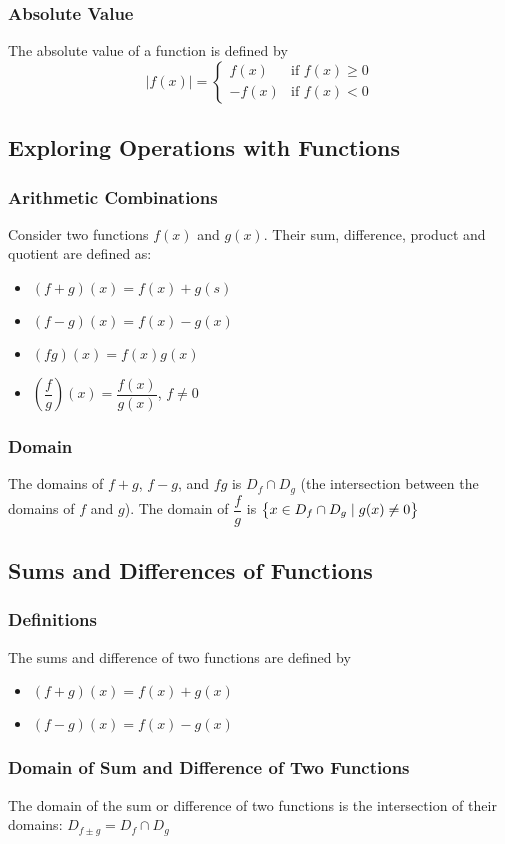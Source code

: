 \documentclass{article}
\begin{document}
	\subsubsection{Absolute Value}
	The absolute value of a function is defined by
	\[|f(x)|=\begin{cases}
		f(x)&\text{if }f(x)\geq0\\
		-f(x)&\text{if }f(x)<0
	\end{cases}\]
	\subsection{Exploring Operations with Functions}
	\subsubsection{Arithmetic Combinations}
	Consider two functions $f(x)$ and $g(x)$. Their sum, difference, product and quotient are defined as:
	\begin{itemize}
		\item $(f+g)(x)=f(x)+g(s)$
		\item $(f-g)(x)=f(x)-g(x)$
		\item $(fg)(x)=f(x)g(x)$
		\item $\left(\dfrac{f}{g}\right)(x)=\dfrac{f(x)}{g(x)}$, $f\neq0$
	\end{itemize}
	\subsubsection{Domain}
	The domains of $f+g$, $f-g$, and $fg$ is $D_f\cap D_g$ (the intersection between the domains of $f$ and $g$). The domain of $\dfrac{f}{g}$ is $\set{x\in D_f\cap D_g\mid g(x)\neq0}$
	\setcounter{section}{9}
	\setcounter{subsection}{1}
	\subsection{Sums and Differences of Functions}
	\subsubsection{Definitions}
	The sums and difference of two functions are defined by
	\begin{itemize}
		\item $(f+g)(x)=f(x)+g(x)$
		\item $(f-g)(x)=f(x)-g(x)$
	\end{itemize}
	\subsubsection{Domain of Sum and Difference of Two Functions}
	The domain of the sum or difference of two functions is the intersection of their domains: $D_{f\pm g}=D_f\cap D_g$
\end{document}
